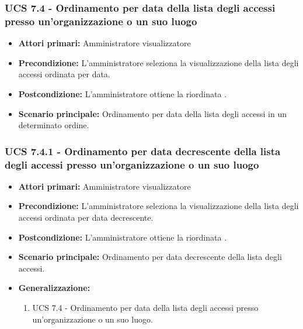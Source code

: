 \subsubsection{UCS 7.4 - Ordinamento per data della lista degli accessi presso un'organizzazione o un suo luogo}
\begin{itemize}
    \item \textbf{Attori primari:} Amministratore visualizzatore
    \item \textbf{Precondizione:} L'amministratore seleziona la visualizzazione della lista degli accessi ordinata per data.
    \item \textbf{Postcondizione:} L'amministratore ottiene la  riordinata .
    \item \textbf{Scenario principale:} Ordinamento per data della lista degli accessi in un determinato ordine.
\end{itemize}

\subsubsection{UCS 7.4.1 - Ordinamento per data decrescente della lista degli accessi presso un'organizzazione o un suo luogo}
\begin{itemize}
	\item \textbf{Attori primari:} Amministratore visualizzatore
	\item \textbf{Precondizione:} L'amministratore seleziona la visualizzazione della lista degli accessi ordinata per data decrescente.
	\item \textbf{Postcondizione:} L'amministratore ottiene la  riordinata .
	\item \textbf{Scenario principale:} Ordinamento per data decrescente della lista degli accessi.
	\item \textbf{Generalizzazione:}
	\begin{enumerate}
		\item UCS 7.4 - Ordinamento per data della lista degli accessi presso un'organizzazione o un suo luogo.
	\end{enumerate} 
\end{itemize}

